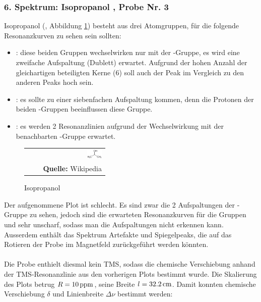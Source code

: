 \documentclass[a4paper,titlepage]{scrartcl}
\numberwithin{equation}{section}
\begin{document}
\subsubsection{6. Spektrum: Isopropanol , Probe Nr. 3}
Isopropanol (, Abbildung \ref{fig:isopropanol}) besteht aus drei Atomgruppen, für die folgende Resonanzkurven zu sehen sein sollten:
\begin{itemize}
\item {}: diese beiden Gruppen wechselwirken nur mit der -Gruppe, es wird eine zweifache Aufspaltung (Dublett) erwartet. Aufgrund der hohen Anzahl der gleichartigen beteiligten Kerne (6) soll auch der Peak im Vergleich zu den anderen Peaks hoch sein.
\item {}: es sollte zu einer siebenfachen Aufspaltung kommen, denn die Protonen der beiden -Gruppen beeinflussen diese Gruppe.
\item {}: es werden 2 Resonanzlinien aufgrund der Wechselwirkung mit der benachbarten -Gruppe erwartet.
\end{itemize}
\begin{figure}[H]
	\centering
	\begin{tabular}{@{}r@{}}
		\includegraphics[width=0.2\textwidth]{images/isopropanol.png}\\
	\footnotesize\sffamily\textbf{Quelle:} Wikipedia \cite{wiki:isopropanol}
	\end{tabular}
	\caption{Isopropanol }
    \label{fig:isopropanol}
\end{figure}
Der aufgenommene Plot ist schlecht. Es sind zwar die 2 Aufspaltungen der -Gruppe zu sehen, jedoch sind die erwarteten Resonanzkurven für die Gruppen  und  sehr unscharf, sodass man die Aufspaltungen nicht erkennen kann. Ausserdem enthält das Spektrum Artefakte und Spiegelpeaks, die auf das Rotieren der Probe im Magnetfeld zurückgeführt werden könnten.\\ \\
Die Probe enthielt diesmal kein TMS, sodass die chemische Verschiebung anhand der TMS-Resonanzlinie aus den vorherigen Plots bestimmt wurde. Die Skalierung des Plots betrug $R=\unit[10]{ppm}$, seine Breite $l=\unit[32.2]{cm}$. Damit konnten chemische Verschiebung $\delta$ und Linienbreite $\Delta \nu$ bestimmt werden:
\end{document}
